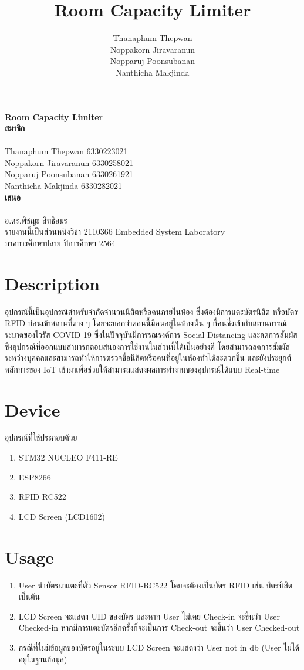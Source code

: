 \documentclass[fontsize=14pt]{extarticle}
\date{}
\title{\huge\textbf{Room Capacity Limiter}}
\author{Thanaphum Thepwan\\ Noppakorn Jiravaranun\\ Nopparuj Poonsubanan\\ Nanthicha Makjinda}
\begin{document}
\begin{center}
    \textbf{\Huge Room Capacity Limiter\\}
    \vspace*{\fill}
    {
        \LARGE
        \textbf{สมาชิก}\\~\\
        Thanaphum Thepwan 6330223021\\
        Noppakorn Jiravaranun 6330258021\\
        Nopparuj Poonsubanan 6330261921\\
        Nanthicha Makjinda 6330282021\\
        \vspace*{\fill}
        \textbf{เสนอ}\\~\\
        อ.ดร.พิชญะ สิทธิอมร\\
        \vspace*{\fill}
        รายงานนี้เป็นส่วนหนึ่งวิชา 2110366 Embedded System Laboratory\\
        ภาคการศึกษาปลาย ปีการศึกษา 2564
    }
\end{center}
\pagebreak
\tableofcontents
\pagebreak
\section{Description}
อุปกรณ์นี้เป็นอุปกรณ์สำหรับจำกัดจำนวนนิสิตหรือคนภายในห้อง ซึ่งต้องมีการแตะบัตรนิสิต หรือบัตร RFID ก่อนเข้าสถานที่ต่าง ๆ
โดยจะบอกว่าตอนนี้มีคนอยู่ในห้องนั้น ๆ กี่คนซึ่งเข้ากับสถานการณ์ระบาดของไวรัส COVID-19
ซึ่งในปัจจุบันมีการรณรงค์การ Social Distancing และลดการสัมผัสซึ่งอุปกรณ์ที่ออกแบบสามารถตอบสนองการใช้งานในส่วนนี้ได้เป็นอย่างดี
โดยสามารถลดการสัมผัสระหว่างบุคคลและสามารถทำให้การตรวจชื่อนิสิตหรือคนที่อยู่ในห้องทำได้สะดวกขึ้น และยังประยุกต์หลักการของ IoT
เข้ามาเพื่อช่วยให้สามารถแสดงผลการทํางานของอุปกรณ์ได้แบบ Real-time
\section{Device}
อุปกรณ์ที่ใช้ประกอบด้วย\\
\begin{enumerate}
    \item STM32 NUCLEO F411-RE
    \item ESP8266
    \item RFID-RC522
    \item LCD Screen (LCD1602)
\end{enumerate}
\section{Usage}
\begin{enumerate}
    \item User นำบัตรมาแตะที่ตัว Sensor RFID-RC522 โดยจะต้องเป็นบัตร RFID เช่น บัตรนิสิต เป็นต้น
    \item LCD Screen จะแสดง UID ของบัตร และหาก User ไม่เคย Check-in จะขึ้นว่า User Checked-in หากมีการแตะบัตรอีกครั้งก็จะเป็นการ Check-out จะขึ้นว่า User Checked-out
    \item กรณีที่ไม่มีข้อมูลของบัตรอยู่ในระบบ LCD Screen จะแสดงว่า User not in db (User ไม่ได้อยู่ในฐานข้อมูล)
\end{enumerate}
\end{document}
